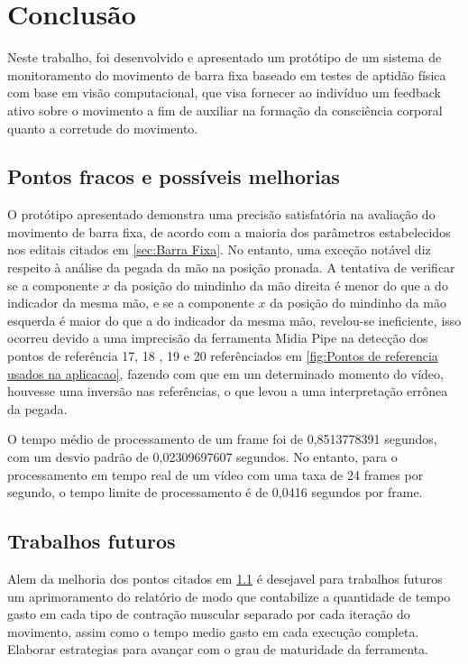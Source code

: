 \chapter{Conclusão}

Neste trabalho, foi desenvolvido e apresentado um protótipo de um sistema de monitoramento do movimento de barra fixa baseado em testes de
aptidão física com base em visão computacional, que visa fornecer ao indivíduo um feedback ativo sobre o movimento a fim de auxiliar na formação da consciência corporal quanto a corretude do movimento.


\section[Pontos fracos e possíveis melhorias]{Pontos fracos e possíveis melhorias}\label{sec:Pontos fracos e possiveis melhorias}

O protótipo apresentado demonstra uma precisão satisfatória na avaliação do movimento de barra fixa, de acordo com a maioria dos parâmetros estabelecidos nos editais citados em \ref{sec:Barra Fixa}. No entanto, uma exceção notável diz respeito à análise da pegada da mão na posição pronada. A tentativa de verificar se a componente $x$ da posição do mindinho da mão direita é menor do que a do indicador da mesma mão, e se a componente $x$ da posição do mindinho da mão esquerda é maior do que a do indicador da mesma mão, revelou-se ineficiente, isso ocorreu devido a uma imprecisão da ferramenta Midia Pipe na detecção dos pontos de referência 17, 18 , 19 e 20 referênciados em \ref{fig:Pontos de referencia usados na aplicacao}, fazendo com que em um determinado momento do vídeo, houvesse uma inversão nas referências, o que levou a uma interpretação errônea da pegada.

O tempo médio de processamento de um frame foi de 0,8513778391 segundos, com um desvio padrão de 0,02309697607 segundos. No entanto, para o processamento em tempo real de um vídeo com uma taxa de 24 frames por segundo, o tempo limite de processamento é de 0,0416 segundos por frame.



\section[Trabalhos futuros]{Trabalhos futuros}
Alem da melhoria dos pontos citados em \ref{sec:Pontos fracos e possiveis melhorias} é desejavel para trabalhos futuros um aprimoramento do relatório de modo que contabilize a quantidade de tempo gasto em cada tipo de contração muscular separado por cada iteração do movimento, assim como o tempo medio gasto em cada execução completa. Elaborar estrategias para avançar com o grau de maturidade da ferramenta.
